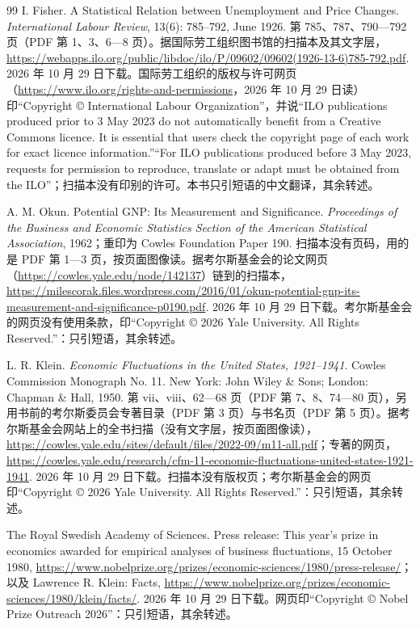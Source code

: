 \begin{thebibliography}{99}
 I. Fisher. A Statistical Relation between Unemployment and Price Changes. \emph{International Labour Review}, 13(6): 785--792, June 1926. 第 785、787、790—792 页（PDF 第 1、3、6—8 页）。据国际劳工组织图书馆的扫描本及其文字层，\url{https://webapps.ilo.org/public/libdoc/ilo/P/09602/09602(1926-13-6)785-792.pdf}. 2026 年 10 月 29 日下载。国际劳工组织的版权与许可网页（\url{https://www.ilo.org/rights-and-permissions}，2026 年 10 月 29 日读）印“Copyright © International Labour Organization”，并说“ILO publications produced prior to 3 May 2023 do not automatically benefit from a Creative Commons licence. It is essential that users check the copyright page of each work for exact licence information.”“For ILO publications produced before 3 May 2023, requests for permission to reproduce, translate or adapt must be obtained from the ILO”；扫描本没有印别的许可。本书只引短语的中文翻译，其余转述。

 A. M. Okun. Potential GNP: Its Measurement and Significance. \emph{Proceedings of the Business and Economic Statistics Section of the American Statistical Association}, 1962；重印为 Cowles Foundation Paper 190. 扫描本没有页码，用的是 PDF 第 1—3 页，按页面图像读。据考尔斯基金会的论文网页（\url{https://cowles.yale.edu/node/142137}）链到的扫描本，\url{https://milescorak.files.wordpress.com/2016/01/okun-potential-gnp-its-measurement-and-significance-p0190.pdf}. 2026 年 10 月 29 日下载。考尔斯基金会的网页没有使用条款，印“Copyright © 2026 Yale University. All Rights Reserved.”：只引短语，其余转述。

 L. R. Klein. \emph{Economic Fluctuations in the United States, 1921--1941}. Cowles Commission Monograph No. 11. New York: John Wiley \& Sons; London: Chapman \& Hall, 1950. 第 vii、viii、62—68 页（PDF 第 7、8、74—80 页），另用书前的考尔斯委员会专著目录（PDF 第 3 页）与书名页（PDF 第 5 页）。据考尔斯基金会网站上的全书扫描（没有文字层，按页面图像读），\url{https://cowles.yale.edu/sites/default/files/2022-09/m11-all.pdf}；专著的网页，\url{https://cowles.yale.edu/research/cfm-11-economic-fluctuations-united-states-1921-1941}. 2026 年 10 月 29 日下载。扫描本没有版权页；考尔斯基金会的网页印“Copyright © 2026 Yale University. All Rights Reserved.”：只引短语，其余转述。

 The Royal Swedish Academy of Sciences. Press release: This year's prize in economics awarded for empirical analyses of business fluctuations, 15 October 1980, \url{https://www.nobelprize.org/prizes/economic-sciences/1980/press-release/}；以及 Lawrence R. Klein: Facts, \url{https://www.nobelprize.org/prizes/economic-sciences/1980/klein/facts/}. 2026 年 10 月 29 日下载。网页印“Copyright © Nobel Prize Outreach 2026”：只引短语，其余转述。


\end{thebibliography}
